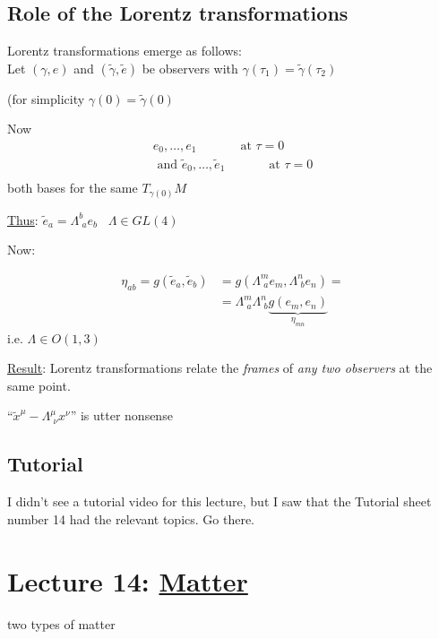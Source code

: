 \documentclass[10pt]{amsart}
\begin{document}
\begin{multicols*}{2}
	\subsection{Role of the Lorentz transformations}
	
	Lorentz transformations emerge as follows: \\
	Let $(\gamma,e)$ and $(\widetilde{\gamma},\widetilde{e})$ be observers with $\gamma(\tau_1) = \widetilde{\gamma}(\tau_2)$
	
	(for simplicity $\gamma(0) = \widetilde{\gamma}(0)$
	
	Now 
	\[
	\begin{gathered}
	e_0 , \dots , e_1 \quad \quad \quad \, \text{ at } \tau = 0 \\
	\text{ and } 
	\widetilde{e}_0 , \dots , \widetilde{e}_1 \quad \quad \quad \, \text{ at }  \tau = 0 \\
	\end{gathered}
	\]
	both bases for the same $T_{\gamma(0)}M$
	
	\underline{Thus}: $\widetilde{e}_a = \Lambda^b_{ \, \, a} e_b $ \quad \quad \, $\Lambda \in GL(4)$
	
	Now:
	
	\[
	\begin{aligned}
	\eta_{ab} = g(\widetilde{e}_a, \widetilde{e}_b) & = g(\Lambda^m_{ \, \, a}e_m, \Lambda^n_{ \, \, b} e_n ) = \\
	& = \Lambda^m_{ \, \, a} \Lambda^n_{ \, \, b} \underbrace{g(e_m,e_n)}_{ \eta_{mn}}
	\end{aligned}
	\]
	i.e. $\Lambda \in O(1,3)$
	
	\underline{Result}: Lorentz transformations relate the \emph{frames} of \emph{any two observers} at the same point.
	
	``$\widetilde{x}^{\mu} - \Lambda^{\mu}_{ \, \, \nu} x^{\nu}$'' is utter nonsense
	
	\subsection*{Tutorial}
	
	I didn't see a tutorial video for this lecture, but I saw that the Tutorial sheet number 14 had the relevant topics.  Go there.
	
	\section{Lecture 14: \underline{Matter}}
	
	two types of matter
	

\end{multicols*}
\end{document}
